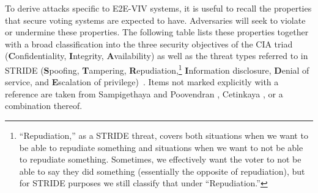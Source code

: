 \documentclass[10pt,letterpaper]{article}
\begin{document}
To derive attacks specific to E2E-VIV systems, it is useful to recall the properties that secure voting systems are expected to have. Adversaries will seek to violate or undermine these properties. The following table lists these properties together with a broad classification into the three security objectives of the CIA triad (\textbf{C}onfidentiality, \textbf{I}ntegrity, \textbf{A}vailability) as well as the threat types referred to in STRIDE (\textbf{S}poofing, \textbf{T}ampering, \textbf{R}epudiation,\footnote{\label{footnote:repudiation} ``Repudiation,'' as a STRIDE threat, covers both situations when we want to be able to repudiate something and situations when we want to not be able to repudiate something. Sometimes, we effectively want the voter to not be able to say they did something (essentially the opposite of repudiation), but for STRIDE purposes we still classify that under ``Repudiation.''}  \textbf{I}nformation disclosure, \textbf{D}enial of service, and \textbf{E}scalation of privilege)~\cite{MicrosoftSecuritySTRIDEChart2007,GroeneveldMasteringSTRIDE}. Items not marked explicitly with a reference are taken from Sampigethaya and Poovendran \cite{SampigethayaPoovendranFrameworkTaxonomy2006}, Cetinkaya \cite{CetinkayaAnalysisSecurity2008}, or a combination thereof.
\end{document}
